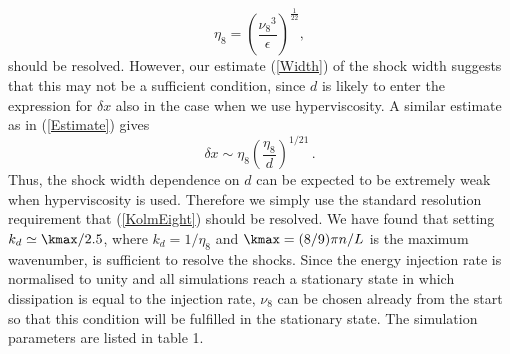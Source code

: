 \begin{equation}  \label{KolmEight}
\eta_{8} = \left( \frac{{\nu_8}^3}{\epsilon} \right)^{\frac{1}{22}},
\end{equation}
should be resolved. However, our estimate (\ref{Width}) of the shock width suggests that this may not be a sufficient condition, since $ d $ is likely to enter the expression for $ \delta x $ also in the case when we use hyperviscosity.
A similar estimate as in (\ref{Estimate}) gives
\begin{equation} \label{EtaEight}
\delta x \sim \eta_{8} \left ( \frac{\eta_8}{d} \right)^{1/21} \, .
\end{equation}
Thus, the shock width dependence on $ d $ can be expected to be extremely weak when hyperviscosity is used. Therefore we simply use the standard resolution requirement that (\ref{KolmEight}) should be resolved. We have found that setting
$  k_{d} \simeq \kmax/ 2.5$, where $ k_{d} = 1/\eta_8 $ and $\kmax =
(8/9)\pi n/L $ is the maximum wavenumber, is  sufficient to resolve the shocks. Since the energy injection rate is normalised to unity and all simulations reach a stationary state in which dissipation is equal to the injection rate, $ \nu_8 $ can be chosen already from the start so that this condition will be fulfilled in the stationary state.
 The  simulation parameters are listed in table 1.

